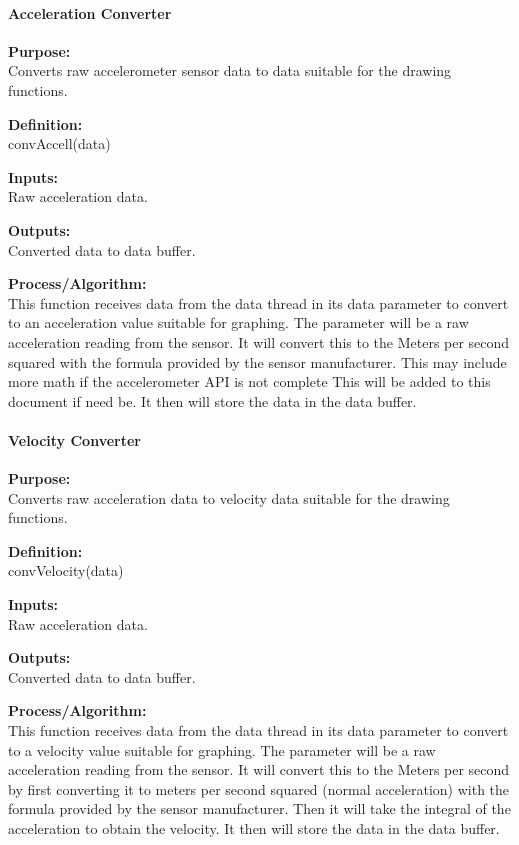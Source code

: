 \documentclass[10pt,draftclsnofoot,onecolumn,retainorgcmds]{IEEEtran}
\begin{document}
\paragraph{Acceleration Converter}
{\bf Purpose:} \\
Converts raw accelerometer sensor data to data suitable for the drawing functions.  \par
{\bf Definition:} \\ 
convAccell(data) \par
{\bf Inputs:} \\ Raw acceleration data. \par
{\bf Outputs:} \\ Converted data to data buffer. \par
{\bf Process/Algorithm:} \\
This function receives data from the data thread in its data parameter to convert to an acceleration value suitable for graphing. The parameter will be a raw acceleration reading from the sensor. It will convert this to the Meters per second squared with the formula provided by the sensor manufacturer. This may include more math if the accelerometer API is not complete This will be added to this document if need be. It then will store the data in the data buffer. \par

\paragraph{Velocity Converter}
{\bf Purpose:} \\
Converts raw acceleration data to velocity data suitable for the drawing functions.  \par
{\bf Definition:} \\ 
convVelocity(data) \par
{\bf Inputs:} \\ Raw acceleration data. \par
{\bf Outputs:} \\ Converted data to data buffer. \par
{\bf Process/Algorithm:} \\
This function receives data from the data thread in its data parameter to convert to a velocity value suitable for graphing. The parameter will be a raw acceleration reading from the sensor. It will convert this to the Meters per second by first converting it to meters per second squared (normal acceleration) with the formula provided by the sensor manufacturer. Then it will take the integral of the acceleration to obtain the velocity.  It then will store the data in the data buffer. \par
\end{document}
